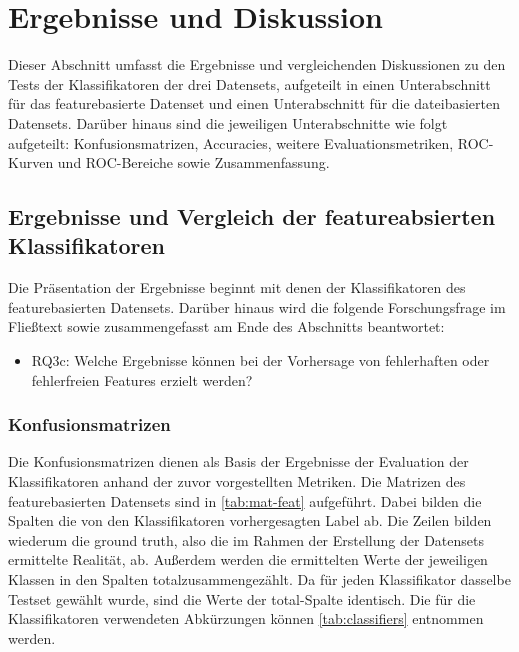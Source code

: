 \section{Ergebnisse und Diskussion}
\label{results}

Dieser Abschnitt umfasst die Ergebnisse und vergleichenden Diskussionen zu den Tests der Klassifikatoren der drei Datensets, aufgeteilt in einen Unterabschnitt für das featurebasierte Datenset und einen Unterabschnitt für die dateibasierten Datensets. Darüber hinaus sind die jeweiligen Unterabschnitte wie folgt aufgeteilt: Konfusionsmatrizen, Accuracies, weitere Evaluationsmetriken, ROC-Kurven und ROC-Bereiche sowie Zusammenfassung.

\subsection{Ergebnisse und Vergleich der featureabsierten Klassifikatoren}
\label{feat-results}

Die Präsentation der Ergebnisse beginnt mit denen der Klassifikatoren des featurebasierten Datensets. Darüber hinaus wird die folgende Forschungsfrage im Fließtext sowie zusammengefasst am Ende des Abschnitts beantwortet:
\vspace{-\topsep}
\begin{itemize}
\setlength{\itemsep}{-2pt}
 \item RQ3c: Welche Ergebnisse können bei der Vorhersage von fehlerhaften oder fehlerfreien Features erzielt werden?
\end{itemize}  

\subsubsection*{Konfusionsmatrizen}

Die Konfusionsmatrizen dienen als Basis der Ergebnisse der Evaluation der Klassifikatoren anhand der zuvor vorgestellten Metriken. Die Matrizen des featurebasierten Datensets sind in \autoref{tab:mat-feat} aufgeführt. Dabei bilden die Spalten die von den Klassifikatoren vorhergesagten Label ab. Die Zeilen bilden wiederum die \glqq ground truth\grqq{}, also die im Rahmen der Erstellung der Datensets ermittelte Realität, ab. Außerdem werden die ermittelten Werte der jeweiligen Klassen in den Spalten \glqq total\grqq zusammengezählt. Da für jeden Klassifikator dasselbe Testset gewählt wurde, sind die Werte der \glqq total\grqq-Spalte identisch. Die für die Klassifikatoren verwendeten Abkürzungen können \autoref{tab:classifiers} entnommen werden.

